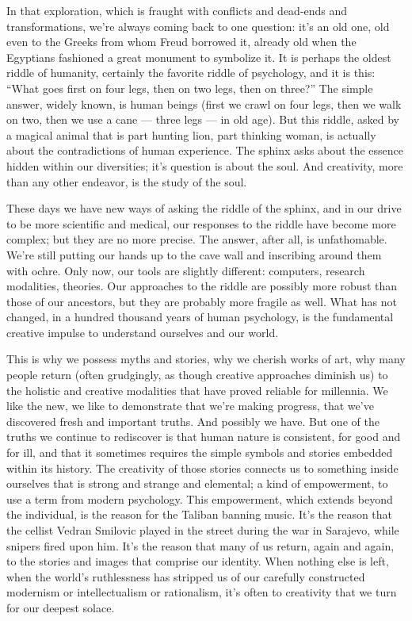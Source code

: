 \documentclass[letterpaper,oneside]{memoir}
\begin{document}
In that exploration, which is fraught with conflicts and dead-ends and  transformations, we're always coming back to one question: it's an old one, old even to the Greeks from whom Freud borrowed it, already old when the Egyptians fashioned a great monument to symbolize it. It is perhaps the oldest riddle of humanity, certainly the favorite riddle of psychology, and it is this: ``What goes first on four legs, then on two legs, then on three?'' The simple answer, widely known, is human beings (first we crawl on four legs, then we walk on two, then we use a cane --- three legs --- in old age). But this riddle, asked by a magical animal that is part hunting lion, part thinking woman, is actually about the contradictions of human experience. The sphinx asks about the essence hidden within our diversities; it's question is about the soul. And creativity, more than any other endeavor, is the study of the soul.

These days we have new ways of asking the riddle of the sphinx, and in our drive to be more scientific and medical, our responses to the riddle have become more complex; but they are no more precise. The answer, after all, is unfathomable. We're still putting our hands up to the cave wall and inscribing around them with ochre. Only now, our tools are slightly different: computers, research modalities, theories. Our approaches to the riddle are possibly more robust than those of our ancestors, but they are probably more fragile as well. What has not changed, in a hundred thousand years of human psychology, is the fundamental creative impulse to understand ourselves and our world.

This is why we possess myths and stories, why we cherish works of art, why many people return (often grudgingly, as though creative approaches diminish us) to the holistic and creative modalities that have proved reliable for millennia. We like the new, we like to demonstrate that we're making progress, that we've discovered fresh and important truths. And possibly we have. But one of the truths we continue to rediscover is that human nature is consistent, for good and for ill, and that it sometimes requires the simple symbols and stories embedded within its history. The creativity of those stories connects us to something inside ourselves that is strong and strange and elemental; a kind of empowerment, to use a term from modern psychology. This empowerment, which extends beyond the individual, is the reason for the Taliban banning music. It's the reason that the cellist Vedran Smilovic played in the street during the war in Sarajevo, while snipers fired upon him. It's the reason that many of us return, again and again, to the stories and images that comprise our identity.  When nothing else is left, when the world's ruthlessness has stripped us of our carefully constructed modernism or intellectualism or rationalism, it's often to creativity that we turn for our deepest solace.
\end{document}
